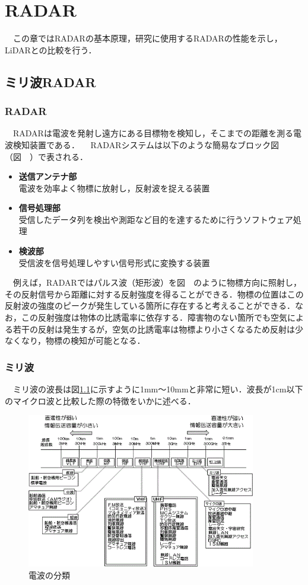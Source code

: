 \chapter{RADAR}
　この章ではRADARの基本原理，研究に使用するRADARの性能を示し，LiDARとの比較を行う．

\section{ミリ波RADAR}
\subsection{RADAR}
　RADARは電波を発射し遠方にある目標物を検知し，そこまでの距離を測る電波検知装置である\cite{RADAR_book}．
　RADARシステムは以下のような簡易なブロック図（図　）で表される．

\begin{itemize}
    \item \textbf{送信アンテナ部}\\
        電波を効率よく物標に放射し，反射波を捉える装置
    \item \textbf{信号処理部}\\
        受信したデータ列を検出や測距など目的を達するために行うソフトウェア処理
    \item \textbf{検波部}\\
        受信波を信号処理しやすい信号形式に変換する装置
\end{itemize}

　例えば，RADARではパルス波（矩形波）を図　のように物標方向に照射し，その反射信号から距離に対する反射強度を得ることができる．物標の位置はこの反射波の強度のピークが発生している箇所に存在すると考えることができる．なお，この反射強度は物体の比誘電率に依存する．障害物のない箇所でも空気による若干の反射は発生するが，空気の比誘電率は物標より小さくなるため反射は少なくなり，物標の検知が可能となる．

\subsection{ミリ波}
　ミリ波の波長は図\ref{fig:ClassificationOfRadioWaves}に示すように1mm～10mmと非常に短い．波長が1cm以下のマイクロ波と比較した際の特徴をいかに述べる\cite{feature_RadioWaves}．

\begin{figure}[H]
    \centering
    \includegraphics[width=10cm]{./fig/ClassificationOfRadioWaves.png}
    \caption{電波の分類\cite{soumu_RadioWaves}}
    \label{fig:ClassificationOfRadioWaves}
\end{figure}

